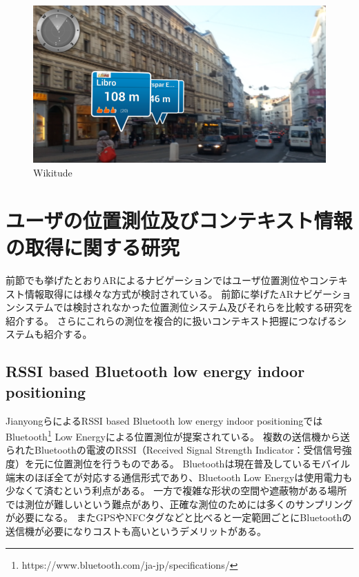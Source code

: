 \begin{figure}[h]
  \centering 
  \includegraphics[width=120mm]{images/Wikitude.png}
  \caption{Wikitude} \label{fig:Wikitude}
\end{figure}



\section{ユーザの位置測位及びコンテキスト情報の取得に関する研究}
前節でも挙げたとおりARによるナビゲーションではユーザ位置測位やコンテキスト情報取得には様々な方式が検討されている。
前節に挙げたARナビゲーションシステムでは検討されなかった位置測位システム及びそれらを比較する研究を紹介する。
さらにこれらの測位を複合的に扱いコンテキスト把握につなげるシステムも紹介する。

\subsection{RSSI based Bluetooth low energy indoor positioning}
JianyongらによるRSSI based Bluetooth low energy indoor positioning\cite{7275525}ではBluetooth\footnote{\textsf{https://www.bluetooth.com/ja-jp/specifications/}} Low Energyによる位置測位が提案されている。
複数の送信機から送られたBluetoothの電波のRSSI（Received Signal Strength Indicator：受信信号強度）を元に位置測位を行うものである。
Bluetoothは現在普及しているモバイル端末のほぼ全てが対応する通信形式であり、Bluetooth Low Energyは使用電力も少なくて済むという利点がある。
一方で複雑な形状の空間や遮蔽物がある場所では測位が難しいという難点があり、正確な測位のためには多くのサンプリングが必要になる。
またGPSやNFCタグなどと比べると一定範囲ごとにBluetoothの送信機が必要になりコストも高いというデメリットがある。



